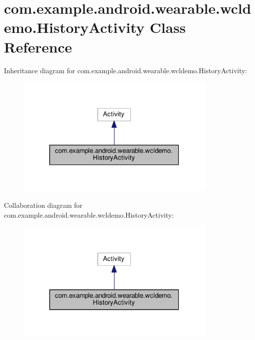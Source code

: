 \hypertarget{classcom_1_1example_1_1android_1_1wearable_1_1wcldemo_1_1HistoryActivity}{}\section{com.\+example.\+android.\+wearable.\+wcldemo.\+History\+Activity Class Reference}
\label{classcom_1_1example_1_1android_1_1wearable_1_1wcldemo_1_1HistoryActivity}


Inheritance diagram for com.\+example.\+android.\+wearable.\+wcldemo.\+History\+Activity\+:
\nopagebreak
\begin{figure}[H]
\begin{center}
\leavevmode
\includegraphics[width=277pt]{d0/dc9/classcom_1_1example_1_1android_1_1wearable_1_1wcldemo_1_1HistoryActivity__inherit__graph}
\end{center}
\end{figure}


Collaboration diagram for com.\+example.\+android.\+wearable.\+wcldemo.\+History\+Activity\+:
\nopagebreak
\begin{figure}[H]
\begin{center}
\leavevmode
\includegraphics[width=277pt]{da/d15/classcom_1_1example_1_1android_1_1wearable_1_1wcldemo_1_1HistoryActivity__coll__graph}
\end{center}
\end{figure}

